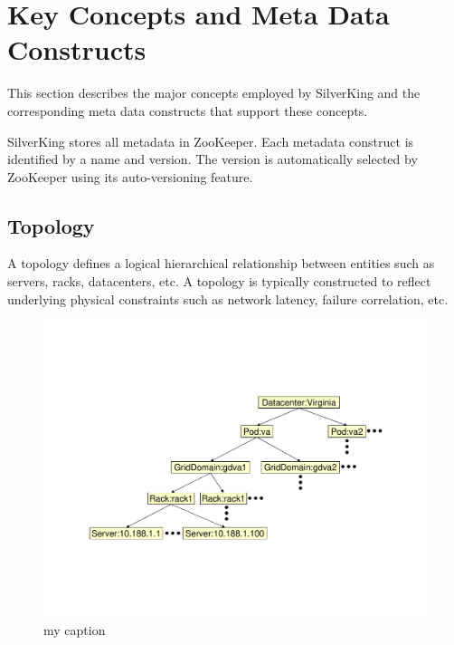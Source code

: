 
\section{Key Concepts and Meta Data Constructs}

This section describes the major concepts employed by SilverKing and the corresponding meta
data constructs that support these concepts.

SilverKing stores all metadata in ZooKeeper. Each metadata construct is identified by a name and version. The version is automatically selected by ZooKeeper using its auto-versioning feature. 

\subsection{Topology}

A topology defines a logical hierarchical relationship between entities such as servers, racks, datacenters, etc. A topology is typically constructed to reflect underlying physical constraints such as network latency, failure correlation, etc.

\begin{figure}[tbh]
\vspace{-0.1in}
\begin{center}
\includegraphics[width=5in, keepaspectration]{Topology.pdf}
\end{center}
\vspace{-0.1in}
\caption{my caption}
\label{fig:Topology}
\vspace{-0.1in}
\end{figure}

